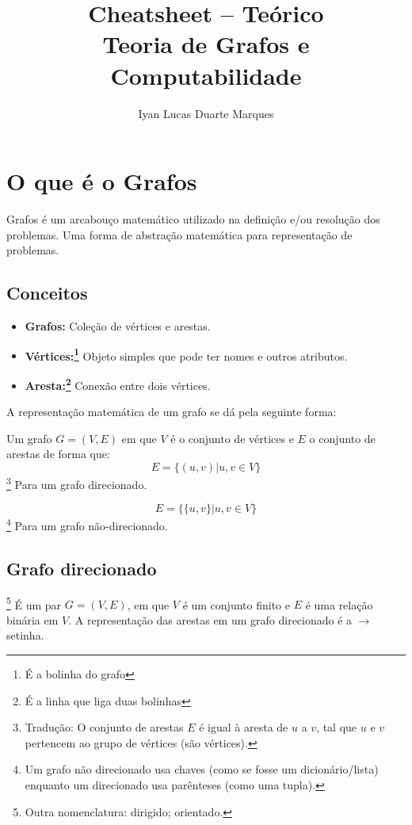 \documentclass[12pt]{article}
\title{Cheatsheet -- Teórico\\ Teoria de Grafos e Computabilidade}
\author{Iyan Lucas Duarte Marques\inst{1}}
\begin{document}
\maketitle

\section{O que é o Grafos}
Grafos é um arcabouço matemático utilizado na definição e/ou resolução dos problemas.
Uma forma de abstração matemática para representação de problemas.

\subsection{Conceitos}
\begin{itemize}
	\item \textbf{Grafos:} Coleção de vértices e arestas.
	\item \textbf{Vértices:\footnote{
			      É a bolinha do grafo
		      }} Objeto simples que pode ter nomes e outros atributos.
	      \item\textbf{Aresta:\footnote{
			      É a linha que liga duas bolinhas
		      }} Conexão entre dois vértices.
\end{itemize}

A representação matemática de um grafo se dá pela seguinte forma:

Um grafo $G = (V,E)$ em que $V$ é o conjunto de vértices e $E$ o conjunto de arestas de forma que:
\begin{equation}
	E = \{(u, v) | u, v \in V\}
\end{equation}\footnote{
	Tradução: O conjunto de arestas $E$ é igual à aresta de $u$ a $v$, tal que $u$ e $v$ pertencem ao grupo de vértices (são vértices).
}
Para um grafo direcionado.

\begin{equation}
	E = \{\{u, v\} | u, v \in V\}
\end{equation}\footnote{
	Um grafo não direcionado usa chaves (como se fosse um dicionário/lista) enquanto um direcionado usa parênteses (como uma tupla).
}
Para um grafo não-direcionado.

\subsection{Grafo direcionado}\footnote{
	Outra nomenclatura: dirigido; orientado.
}
É um par $G = (V, E)$, em que $V$ é um conjunto finito e $E$ é uma relação binária em $V$.
A representação das arestas em um grafo direcionado é a $\longrightarrow$ setinha.
\end{document}
